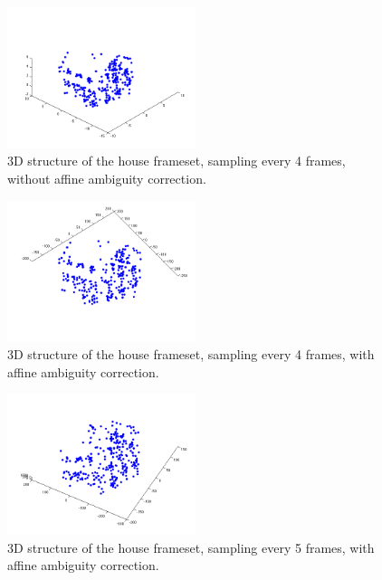 \begin{figure}[ht!]
  \centering
    \includegraphics[width=0.49\textwidth]{figures/icp4-11-Amb.png}
    \caption{3D structure of the house frameset, sampling every 4 frames, without affine ambiguity correction.}
    \label{fig:icp4-11-Amb}
\end{figure}

\begin{figure}[ht!]
  \centering
    \includegraphics[width=0.49\textwidth]{figures/icp4-11.png}
    \caption{3D structure of the house frameset, sampling every 4 frames, with affine ambiguity correction.}
    \label{fig:icp4-11}
\end{figure}

\begin{figure}[ht!]
  \centering
    \includegraphics[width=0.49\textwidth]{figures/icp5-8.png}
    \caption{3D structure of the house frameset, sampling every 5 frames, with affine ambiguity correction.}
    \label{fig:icp5-8}
\end{figure}

